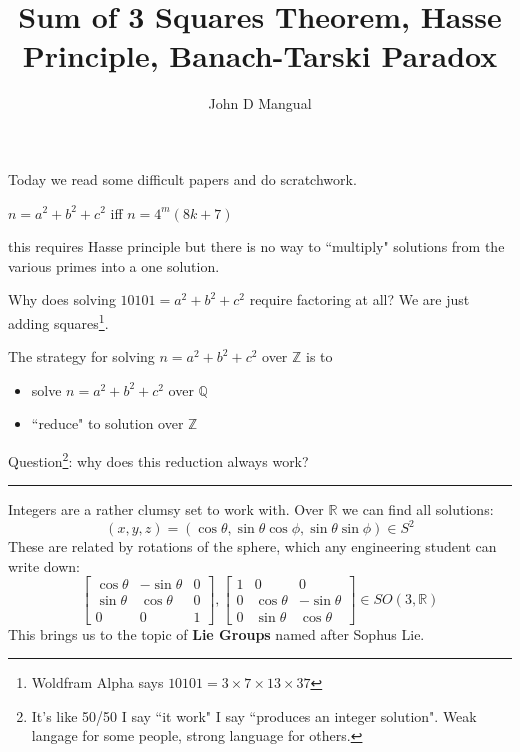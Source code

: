 \documentclass[12pt]{article}
\title{\textbf{ Sum of 3 Squares Theorem, Hasse Principle, Banach-Tarski Paradox }}
\author{John D Mangual}
\date{}
\begin{document}
\selectfont \fontsize{25}{30}\selectfont

\maketitle

\noindent Today we read some difficult papers and do scratchwork. \newline

\noindent $n = a^2 + b^2 + c^2$ iff $n = 4^m(8k+7)$ \newline

\noindent this requires Hasse principle but there is no way to ``multiply" solutions from the various primes into a one solution.  \newline

\noindent Why does solving $10101 = a^2 + b^2 + c^2$ require factoring at all?  We are just adding squares\footnote{Woldfram Alpha says $10101 = 3 \times 7 \times 13 \times 37$}.

\newpage

\noindent The strategy for solving $n  = a^2 + b^2 + c^2$ over $\mathbb{Z}$ is to 
\begin{itemize}
\item solve $n = a^2 + b^2 + c^2$ over $\mathbb{Q}$ 
\item ``reduce" to solution over $\mathbb{Z}$
\end{itemize}
Question\footnote{It's like 50/50 I say ``it work" I say ``produces an integer solution".  Weak langage for some people, strong language for others.}\;: why does this reduction always work? 

\vspace{12pt}
\hrule
\vspace{12pt}

\noindent Integers are a rather clumsy set to work with.  Over $\mathbb{R}$ we can find all solutions:
$$ (x,y,z) = (\cos \theta, \sin \theta \cos \phi, \sin \theta \sin \phi) \in S^2 $$
These are related by rotations of the sphere, which any engineering student can write down:
$$ \left[ \begin{array}{cr|c} 
\cos \theta & -\sin \theta & 0 \\
\sin \theta & \cos \theta & 0 \\ \hline
0 & 0 & 1
\end{array} \right]
, \left[ \begin{array}{c|cr} 
1 & 0 & 0 \\ \hline
0 & \cos \theta & -\sin \theta  \\
0 & \sin \theta & \cos \theta  
\end{array} \right]  \in SO( 3, \mathbb{R} )$$
This brings us to the topic of \textbf{Lie Groups} named after Sophus Lie.
\newpage
\end{document}
